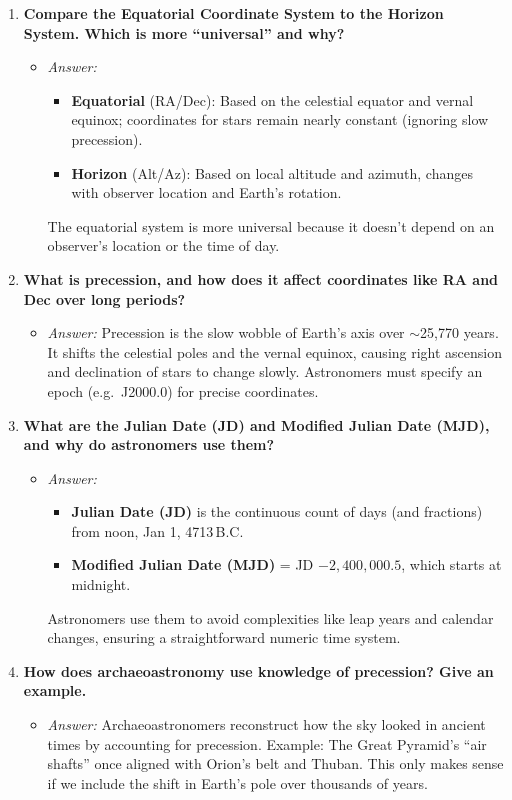 \begin{enumerate}
  \item \textbf{Compare the Equatorial Coordinate System to the Horizon System. Which is more ``universal'' and why?}
  \begin{itemize}
    \item \emph{Answer:} 
    \begin{itemize}
      \item \textbf{Equatorial} (RA/Dec): Based on the celestial equator and vernal equinox; coordinates for stars remain nearly constant (ignoring slow precession).
      \item \textbf{Horizon} (Alt/Az): Based on local altitude and azimuth, changes with observer location and Earth’s rotation.
    \end{itemize}
    The equatorial system is more universal because it doesn’t depend on an observer’s location or the time of day.
  \end{itemize}
  
  \item \textbf{What is precession, and how does it affect coordinates like RA and Dec over long periods?}
  \begin{itemize}
    \item \emph{Answer:} Precession is the slow wobble of Earth’s axis over $\sim$25{,}770 years. It shifts the celestial poles and the vernal equinox, causing right ascension and declination of stars to change slowly. Astronomers must specify an epoch (e.g.\ J2000.0) for precise coordinates.
  \end{itemize}
  
  \item \textbf{What are the Julian Date (JD) and Modified Julian Date (MJD), and why do astronomers use them?}
  \begin{itemize}
    \item \emph{Answer:} 
    \begin{itemize}
      \item \textbf{Julian Date (JD)} is the continuous count of days (and fractions) from noon, Jan 1, 4713\,B.C.
      \item \textbf{Modified Julian Date (MJD)} = JD $- 2{,}400{,}000.5$, which starts at midnight.
    \end{itemize}
    Astronomers use them to avoid complexities like leap years and calendar changes, ensuring a straightforward numeric time system.
  \end{itemize}
  
  \item \textbf{How does archaeoastronomy use knowledge of precession? Give an example.}
  \begin{itemize}
    \item \emph{Answer:} Archaeoastronomers reconstruct how the sky looked in ancient times by accounting for precession. Example: The Great Pyramid’s ``air shafts'' once aligned with Orion’s belt and Thuban. This only makes sense if we include the shift in Earth’s pole over thousands of years.
  \end{itemize}
  

\end{enumerate}
